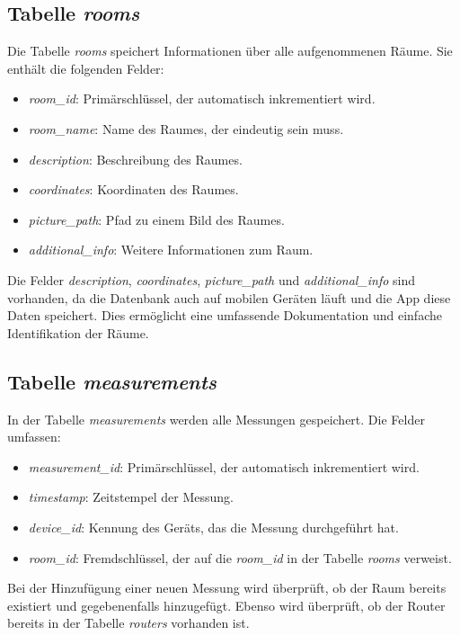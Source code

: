 \subsection{Tabelle \textit{rooms}}

Die Tabelle \textit{rooms} speichert Informationen über alle aufgenommenen Räume. Sie enthält die folgenden Felder:
\begin{itemize}
    \item \textit{room\_id}: Primärschlüssel, der automatisch inkrementiert wird.
    \item \textit{room\_name}: Name des Raumes, der eindeutig sein muss.
    \item \textit{description}: Beschreibung des Raumes.
    \item \textit{coordinates}: Koordinaten des Raumes.
    \item \textit{picture\_path}: Pfad zu einem Bild des Raumes.
    \item \textit{additional\_info}: Weitere Informationen zum Raum.
\end{itemize}

Die Felder \textit{description}, \textit{coordinates}, \textit{picture\_path} und \textit{additional\_info} sind vorhanden, da die Datenbank auch auf mobilen Geräten läuft und die App diese Daten speichert. Dies ermöglicht eine umfassende Dokumentation und einfache Identifikation der Räume.

\subsection{Tabelle \textit{measurements}}

In der Tabelle \textit{measurements} werden alle Messungen gespeichert. Die Felder umfassen:
\begin{itemize}
    \item \textit{measurement\_id}: Primärschlüssel, der automatisch inkrementiert wird.
    \item \textit{timestamp}: Zeitstempel der Messung.
    \item \textit{device\_id}: Kennung des Geräts, das die Messung durchgeführt hat.
    \item \textit{room\_id}: Fremdschlüssel, der auf die \textit{room\_id} in der Tabelle \textit{rooms} verweist.
\end{itemize}

Bei der Hinzufügung einer neuen Messung wird überprüft, ob der Raum bereits existiert und gegebenenfalls hinzugefügt. Ebenso wird überprüft, ob der Router bereits in der Tabelle \textit{routers} vorhanden ist.

